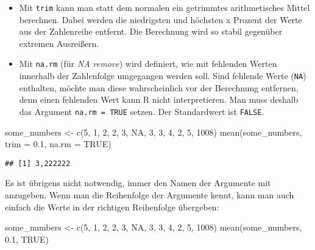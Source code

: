 \documentclass[
]{book}
\newenvironment{Shaded}{\begin{snugshade}}{\end{snugshade}}
\newcommand{\AttributeTok}[1]{\textcolor[rgb]{0.77,0.63,0.00}{#1}}
\newcommand{\ConstantTok}[1]{\textcolor[rgb]{0.00,0.00,0.00}{#1}}
\newcommand{\DecValTok}[1]{\textcolor[rgb]{0.00,0.00,0.81}{#1}}
\newcommand{\FloatTok}[1]{\textcolor[rgb]{0.00,0.00,0.81}{#1}}
\newcommand{\FunctionTok}[1]{\textcolor[rgb]{0.00,0.00,0.00}{#1}}
\newcommand{\NormalTok}[1]{#1}
\newcommand{\OtherTok}[1]{\textcolor[rgb]{0.56,0.35,0.01}{#1}}
\begin{document}
\begin{itemize}
\item
  Mit \texttt{trim} kann man statt dem normalen ein getrimmtes arithmetisches Mittel berechnen. Dabei werden die niedrigsten und höchsten x Prozent der Werte aus der Zahlenreihe entfernt. Die Berechnung wird so stabil gegenüber extremen Ausreißern.
\item
  Mit \texttt{na.rm} (für \emph{NA remove}) wird definiert, wie mit fehlenden Werten innerhalb der Zahlenfolge umgegangen werden soll. Sind fehlende Werte (\texttt{NA}) enthalten, möchte man diese wahrscheinlich vor der Berechnung entfernen, denn einen fehlenden Wert kann R nicht interpretieren. Man muss deshalb das Argument \texttt{na.rm\ =\ TRUE} setzen. Der Standardwert ist \texttt{FALSE}.
\end{itemize}

\begin{Shaded}
\begin{Highlighting}[]
\NormalTok{some\_numbers }\OtherTok{\textless{}{-}} \FunctionTok{c}\NormalTok{(}\DecValTok{5}\NormalTok{, }\DecValTok{1}\NormalTok{, }\DecValTok{2}\NormalTok{, }\DecValTok{2}\NormalTok{, }\DecValTok{3}\NormalTok{, }\ConstantTok{NA}\NormalTok{, }\DecValTok{3}\NormalTok{, }\DecValTok{3}\NormalTok{, }\DecValTok{4}\NormalTok{, }\DecValTok{2}\NormalTok{, }\DecValTok{5}\NormalTok{, }\DecValTok{1008}\NormalTok{)}
\FunctionTok{mean}\NormalTok{(some\_numbers, }\AttributeTok{trim =} \FloatTok{0.1}\NormalTok{, }\AttributeTok{na.rm =} \ConstantTok{TRUE}\NormalTok{)}
\end{Highlighting}
\end{Shaded}

\begin{verbatim}
## [1] 3,222222
\end{verbatim}

Es ist übrigens nicht notwendig, immer den Namen der Argumente mit anzugeben. Wenn man die Reihenfolge der Argumente kennt, kann man auch einfach die Werte in der richtigen Reihenfolge übergeben:

\begin{Shaded}
\begin{Highlighting}[]
\NormalTok{some\_numbers }\OtherTok{\textless{}{-}} \FunctionTok{c}\NormalTok{(}\DecValTok{5}\NormalTok{, }\DecValTok{1}\NormalTok{, }\DecValTok{2}\NormalTok{, }\DecValTok{2}\NormalTok{, }\DecValTok{3}\NormalTok{, }\ConstantTok{NA}\NormalTok{, }\DecValTok{3}\NormalTok{, }\DecValTok{3}\NormalTok{, }\DecValTok{4}\NormalTok{, }\DecValTok{2}\NormalTok{, }\DecValTok{5}\NormalTok{, }\DecValTok{1008}\NormalTok{)}
\FunctionTok{mean}\NormalTok{(some\_numbers, }\FloatTok{0.1}\NormalTok{, }\ConstantTok{TRUE}\NormalTok{)}
\end{Highlighting}
\end{Shaded}
\end{document}
